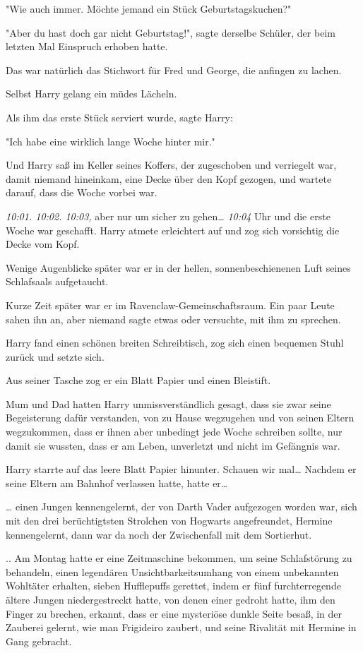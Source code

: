 {"Wie auch immer. Möchte jemand ein Stück Geburtstagskuchen?"

"Aber du hast doch gar nicht Geburtstag!", sagte derselbe Schüler, der beim letzten Mal Einspruch erhoben hatte.

Das war natürlich das Stichwort für Fred und George, die anfingen zu lachen.

Selbst Harry gelang ein müdes Lächeln.

Als ihm das erste Stück serviert wurde, sagte Harry:

"Ich habe eine wirklich lange Woche hinter mir."

Und Harry saß im Keller seines Koffers, der zugeschoben und verriegelt war, damit niemand hineinkam, eine Decke über den Kopf gezogen, und wartete darauf, dass die Woche vorbei war.

\emph{10:01. 10:02. 10:03,} aber nur um sicher zu gehen… \emph{10:04} Uhr und die erste Woche war geschafft. Harry atmete erleichtert auf und zog sich vorsichtig die Decke vom Kopf.

Wenige Augenblicke später war er in der hellen, sonnenbeschienenen Luft seines Schlafsaals aufgetaucht.

Kurze Zeit später war er im Ravenclaw-Gemeinschaftsraum. Ein paar Leute sahen ihn an, aber niemand sagte etwas oder versuchte, mit ihm zu sprechen.

Harry fand einen schönen breiten Schreibtisch, zog sich einen bequemen Stuhl zurück und setzte sich.

Aus seiner Tasche zog er ein Blatt Papier und einen Bleistift.

Mum und Dad hatten Harry unmissverständlich gesagt, dass sie zwar seine Begeisterung dafür verstanden, von zu Hause wegzugehen und von seinen Eltern wegzukommen, dass er ihnen aber unbedingt jede Woche schreiben sollte, nur damit sie wussten, dass er am Leben, unverletzt und nicht im Gefängnis war.

Harry starrte auf das leere Blatt Papier hinunter. Schauen wir mal… Nachdem er seine Eltern am Bahnhof verlassen hatte, hatte er…

… einen Jungen kennengelernt, der von Darth Vader aufgezogen worden war, sich mit den drei berüchtigtsten Strolchen von Hogwarts angefreundet, Hermine kennengelernt, dann war da noch der Zwischenfall mit dem Sortierhut.

.. Am Montag hatte er eine Zeitmaschine bekommen, um seine Schlafstörung zu behandeln, einen legendären Unsichtbarkeitsumhang von einem unbekannten Wohltäter erhalten, sieben Hufflepuffs gerettet, indem er fünf furchterregende ältere Jungen niedergestreckt hatte, von denen einer gedroht hatte, ihm den Finger zu brechen, erkannt, dass er eine mysteriöse dunkle Seite besaß, in der Zauberei gelernt, wie man Frigideiro zaubert, und seine Rivalität mit Hermine in Gang gebracht.

}
